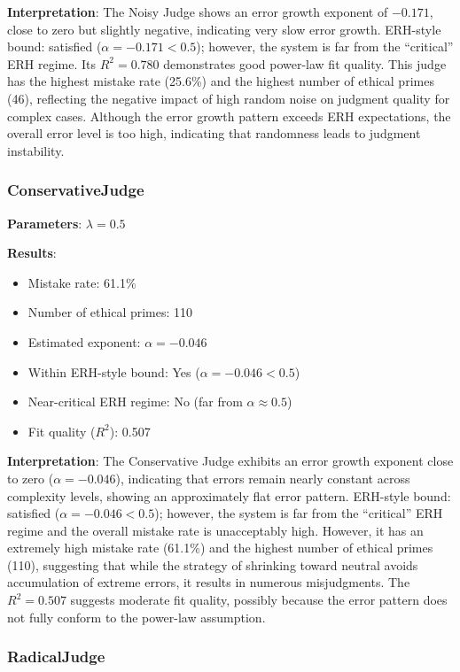 \documentclass[12pt,a4paper]{article}
\theoremstyle{definition}
\theoremstyle{remark}
\begin{document}
\textbf{Interpretation}: The Noisy Judge shows an error growth exponent of $-0.171$, close to zero but slightly negative, indicating very slow error growth. ERH-style bound: satisfied ($\alpha = -0.171 < 0.5$); however, the system is far from the ``critical'' ERH regime. Its $R^2 = 0.780$ demonstrates good power-law fit quality. This judge has the highest mistake rate (25.6\%) and the highest number of ethical primes (46), reflecting the negative impact of high random noise on judgment quality for complex cases. Although the error growth pattern exceeds ERH expectations, the overall error level is too high, indicating that randomness leads to judgment instability.

\subsubsection{ConservativeJudge}

\textbf{Parameters}: $\lambda = 0.5$

\textbf{Results}:
\begin{itemize}
    \item Mistake rate: 61.1\%
    \item Number of ethical primes: 110
    \item Estimated exponent: $\alpha = -0.046$
    \item Within ERH-style bound: Yes ($\alpha = -0.046 < 0.5$)
    \item Near-critical ERH regime: No (far from $\alpha \approx 0.5$)
    \item Fit quality ($R^2$): 0.507
\end{itemize}

\textbf{Interpretation}: The Conservative Judge exhibits an error growth exponent close to zero ($\alpha = -0.046$), indicating that errors remain nearly constant across complexity levels, showing an approximately flat error pattern. ERH-style bound: satisfied ($\alpha = -0.046 < 0.5$); however, the system is far from the ``critical'' ERH regime and the overall mistake rate is unacceptably high. However, it has an extremely high mistake rate (61.1\%) and the highest number of ethical primes (110), suggesting that while the strategy of shrinking toward neutral avoids accumulation of extreme errors, it results in numerous misjudgments. The $R^2 = 0.507$ suggests moderate fit quality, possibly because the error pattern does not fully conform to the power-law assumption.

\subsubsection{RadicalJudge}
\end{document}
